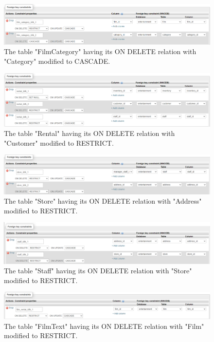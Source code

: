 \documentclass[openany]{article}
\begin{document}
		\begin{figure}[H]
			\includegraphics[width=\textwidth]{category_cascade}
			\caption{The table "Film\textunderscore Category" having its ON DELETE relation with "Category" modified to CASCADE.}
		\end{figure}
		\begin{figure}[H]
			\includegraphics[width=\textwidth]{customer_restrict}
			\caption{The table "Rental" having its ON DELETE relation with "Customer" modified to RESTRICT.}
		\end{figure}
		\begin{figure}[H]
			\includegraphics[width=\textwidth]{address_restrict}
			\caption{The table "Store" having its ON DELETE relation with "Address" modified to RESTRICT.}
		\end{figure}
		\begin{figure}[H]
			\includegraphics[width=\textwidth]{store_restrict}
			\caption{The table "Staff" having its ON DELETE relation with "Store" modified to RESTRICT.}
		\end{figure}
		\begin{figure}[H]
			\includegraphics[width=\textwidth]{film_restrict}
			\caption{The table "Film\textunderscore Text" having its ON DELETE relation with "Film" modified to RESTRICT.}
		\end{figure}
\end{document}
